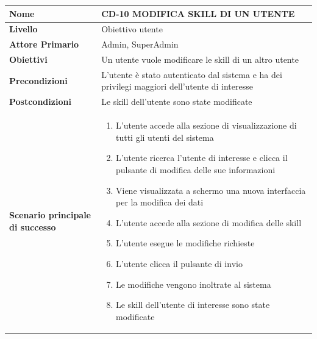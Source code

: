 \begin{center}
    \begin{tabular}{|p{0.3\linewidth}|p{0.7\linewidth}|}
    \hline
    \rowcolor{Blue}
    \textbf{Nome} & CD-10 MODIFICA SKILL DI UN UTENTE \\
    \hline
    \rowcolor{DarkBlue}
    \textbf{Livello} & Obiettivo utente \\
    \hline
    \rowcolor{LightBlue}
    \textbf{Attore Primario} & Admin, SuperAdmin \\
    \hline
    \rowcolor{LightBlue}
    \textbf{Obiettivi} & Un utente vuole modificare le skill di un altro utente \\
    \hline
    \rowcolor{Blue}
    \textbf{Precondizioni} & L’utente è stato autenticato dal sistema e ha dei privilegi maggiori dell’utente di interesse \\
    \hline
    \rowcolor{LightBlue}
    \textbf{Postcondizioni} & Le skill dell’utente sono state modificate \\
    \hline
    \rowcolor{LighterBlue}
        \begin{center}
        \textbf{Scenario principale di successo}
    \end{center} 
    & 
    \begin{enumerate}
        \item L’utente accede alla sezione di visualizzazione di tutti gli utenti del sistema
        \item L’utente ricerca l’utente di interesse e clicca il pulsante di modifica delle sue informazioni
        \item Viene visualizzata a schermo una nuova interfaccia per la modifica dei dati
        \item L’utente accede alla sezione di modifica delle skill
        \item L’utente esegue le modifiche richieste
        \item L’utente clicca il pulsante di invio
        \item Le modifiche vengono inoltrate al sistema
        \item Le skill dell’utente di interesse sono state modificate
    \end{enumerate}
    \\
    \hline
    \end{tabular}
\end{center}

